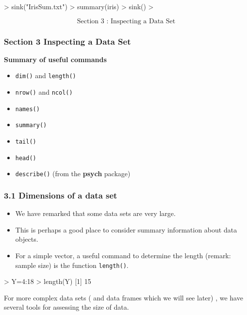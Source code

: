  \begin{framed}
 \begin{semiverbatim}
 > sink("IrisSum.txt")
 > summary(iris)
 > sink()
 >
 \end{semiverbatim}
 \end{framed}
 
 
 
 
 \Huge
 \[\mbox{ Section 3 : Inspecting a Data Set } \]
 
 
 \frametitle{Section 3 Inspecting a Data Set}
 \large 
 \textbf{Summary of useful commands}
 \begin{itemize}
 \item \texttt{dim()} and \texttt{length()}
 \item \texttt{nrow()} and \texttt{ncol()}
 \item \texttt{names()}
 \item \texttt{summary()}
 \item \texttt{tail()}
 \item \texttt{head()}
 \item \texttt{describe()} (from the \textbf{psych} package)
 \end{itemize}
 
 
 
 \frametitle{3.1 Dimensions of a data set}
 \begin{itemize}
 \item We have remarked that some data sets are very large. 
 \item This is perhaps a good place to consider
 summary information about data objects. 
 \item For a simple vector, a useful command to determine
 the length (remark: sample size) is the function \texttt{length()}.
 \end{itemize}
 \begin{framed}
 \begin{semiverbatim}
 > Y=4:18
 > length(Y)
 [1] 15
 \end{semiverbatim}
 \end{framed}
 For more complex data sets ( and data frames which we will see later) , we have several
 tools for assessing the size of data.
 
